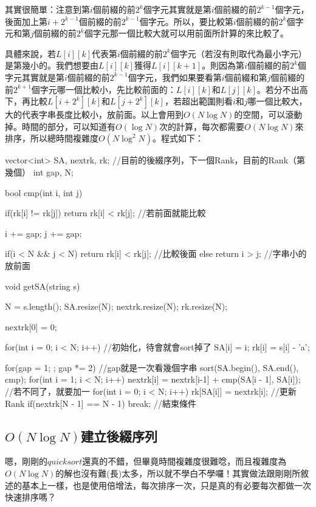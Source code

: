 			其實很簡單：注意到第$i$個前綴的前$2^{k}$個字元其實就是第$i$個前綴的前$2^{k - 1}$個字元，後面加上第$i + 2^{k - 1}$個前綴的前$2^{k - 1}$個字元。所以，要比較第$i$個前綴的前$2^{k}$個字元和第$j$個前綴的前$2^{k}$個字元那一個比較大就可以用前面所計算的來比較了。
			
			
			具體來說，若$L[i][k]$代表第$i$個前綴的前$2^{k}
			$個字元（若沒有則取代為最小字元）是第幾小的。我們想要由$L[i][k]$獲得$L[i][k + 1]$。則因為第$i$個前綴的前$2^{k}$個字元其實就是第$i$個前綴的前$2^{k - 1}$個字元，我們如果要看第$i$個前綴和第$j$個前綴的前$2^{k + 1}$個字元哪一個比較小，先比較前面的：$L[i][k]$和$L[j][k]$。若分不出高下，再比較$L[i + 2^{k}][k]$和$L[j + 2^{k}][k]$，若超出範圍則看$i$和$j$哪一個比較大，大的代表字串長度比較小，放前面。以上會用到$O(N \log N)$的空間，可以滾動掉。時間的部分，可以知道有$O(\log N)$次的計算，每次都需要$O(N \log N)$來排序，所以總時間複雜度$O(N \log^2 N)$。程式如下：
			\begin{C++}
vector<int> SA, nextrk, rk; //目前的後綴序列，下一個Rank，目前的Rank（第幾個）
int gap, N;

bool cmp(int i, int j){
	if(rk[i] != rk[j]) 
		return rk[i] < rk[j]; //若前面就能比較
	
	i += gap;
	j += gap;
	
	if(i < N && j < N) 
		return rk[i] < rk[j]; //比較後面
	else 
		return i > j; //字串小的放前面
}

void getSA(string s){
	N = s.length();
	SA.resize(N);
	nextrk.resize(N);
	rk.resize(N);
	
	nextrk[0] = 0;
	
	for(int i = 0; i < N; i++){ //初始化，待會就會sort掉了
		SA[i] = i;
		rk[i] = s[i] - 'a';
	}
	
	for(gap = 1; ; gap *= 2){ //gap就是一次看幾個字串
		sort(SA.begin(), SA.end(), cmp);
		for(int i = 1; i < N; i++) 
			nextrk[i] = nextrk[i-1] + cmp(SA[i - 1], SA[i]); //若不同了，就要加一
		for(int i = 0; i < N; i++) 
			rk[SA[i]] = nextrk[i]; //更新Rank
		if(nextrk[N - 1] == N - 1) break; //結束條件
	}
}
			\end{C++}		
		\subsection{$O(N \log N)$建立後綴序列}
		嗯，剛剛的$quick sort$還真的不錯，但畢竟時間複雜度很難唸，而且複雜度為$O(N \log N)$的解也沒有難(長)太多，所以就不學白不學囉！其實做法跟剛剛所敘述的基本上一樣，也是使用倍增法，每次排序一次，只是真的有必要每次都做一次快速排序嗎？
		
